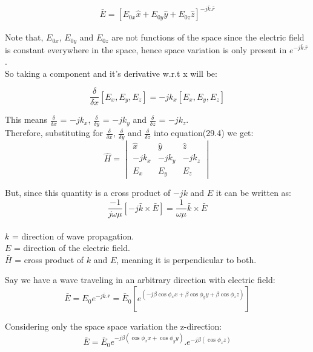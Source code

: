 \begin{align}
	\bar{E} = [E_{0x}\hat{x} + E_{0y}\hat{y} + E_{0z}\hat{z}]^{-j\bar{k}.\bar{r}}
\end{align}

Note that, $E_{0x}$, $E_{0y}$ and $E_{0z}$ are not functions of the space since the electric field is constant everywhere in the space, hence space variation is only present in $e^{-j\bar{k}.\bar{r}}$.\\
So taking a component and it's derivative w.r.t x will be:

\begin{equation}
\frac{\delta}{\delta x} [E_x,E_y,E_z] = -jk_x[E_x,E_y,E_z]
\end{equation}

This means $\frac{\delta}{\delta x}$ = $-jk_x$, $\frac{\delta}{\delta y}$ = $-jk_y$ 
and $\frac{\delta}{\delta z}$ = $-jk_z$.\\
Therefore, substituting for $\frac{\delta}{\delta x}$, $\frac{\delta}{\delta y}$ and $\frac{\delta}{\delta z}$ into equation(29.4) we get:
\begin{equation}
\hat{H} = 
\begin{vmatrix}
\hat{x} & \hat{y} & \hat{z}\\
-jk_x & -jk_y & -jk_z\\
E_{x} & E_{y} & E_{z}
\end{vmatrix}
\end{equation}

But, since this quantity is a cross product of $-jk$ and $E$ it can be written as:
\begin{equation}
\frac{-1}{j\omega\mu} [-j\bar{k}\times\bar{E}] = \frac{1}{\omega\mu} \bar{k}\times\bar{E}
\end{equation}
\\
$k$ = direction of wave propagation.\\
$E$ = direction of the electric field.\\
$\bar{H}$ = cross product of $k$ and $E$, meaning it is perpendicular to both.

Say we have a wave traveling in an arbitrary direction with electric field:
\begin{equation}
\bar{E} = E_0 e^{-j\bar{k}.\bar{r}} = \bar{E}_0[e^{(-j\beta\cos\phi_{x}x + \beta\cos\phi_{y}y + \beta\cos\phi_{z}z)}]
\end{equation}

Considering only the space space variation the z-direction:
\begin{equation}
	\bar{E} = \bar{E}_0 e^{-j\beta(\cos\phi_{x}x + \cos\phi_{y}y)}.e^{-j\beta(\cos\phi_{z}z)}
\end{equation}

